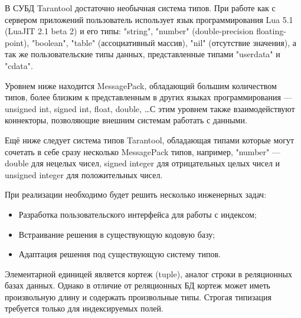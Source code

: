 В СУБД Tarantool достаточно необычная система типов.
При работе как с сервером приложений пользователь использует язык программирования
Lua 5.1 (LuaJIT 2.1 beta 2) и его типы: "string", "number" (double-precision floating-point),
"boolean", "table" (ассоциативный массив), "nil" (отсутствие значения),
а так же пользовательские типы данных, представленные типами "userdata" и "cdata".

Уровнем ниже находится MessagePack, обладающий большим количеством типов,
более близким к представленным в других языках программирования ---
unsigned int, signed int, float, double, \ldots С этим уровнем также взаимодействуют
коннекторы, позволяющие внешним системам работать с данными.

Ещё ниже следует система типов Tarantool, обладающая
типами которые могут сочетать в себе сразу несколько MessagePack типов, например,
"number" --- double для нецелых чисел, signed integer для отрицательных целых чисел
и unsigned integer для положительных чисел.

При реализации необходимо будет решить несколько инженерных задач:
\begin{itemize}
	\item Разработка пользовательского интерфейса для работы с индексом;
	\item Встраивание решения в существующую кодовую базу;
	\item Адаптация решения под существующую систему типов.
\end{itemize}

Элементарной единицей является кортеж (tuple), аналог строки в
реляционных базах данных. Однако в отличие от реляционных БД
кортеж может иметь произвольную длину и содержать произвольные типы.
Строгая типизация требуется только для индексируемых полей.
